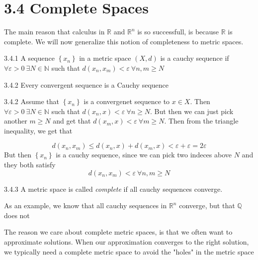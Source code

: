 \documentclass[a4paper,norsk]{article}
\renewcommand{\geq}{\geqslant}
\renewcommand{\leq}{\leqslant}
\renewcommand{\epsilon}{\varepsilon}
\begin{document}
\section*{3.4 Complete Spaces}

The main reason that calculus in $ \mathbb{R} $ and $ \mathbb{R}^n $ is so successfull, is because $ \mathbb{R} $ is complete. We will now generalize this notion of completeness to metric spaces.

\begin{definitionbox}{3.4.1}{}
A sequence $ \left\{ x_n \right\}  $ in a metric space $ \left( X, d \right)  $ is a cauchy sequence if $ \forall  \epsilon > 0 \: \exists N \in \mathbb{N} $ such that $ d(x_n, x_m) < \epsilon \: \forall n, m \geq N $ 
\end{definitionbox}

\begin{propositionbox}{3.4.2}{}
Every convergent sequence is a Cauchy sequence

\begin{proofbox}{3.4.2}{}
  Assume that $ \left\{ x_n \right\}  $ is a convergenet sequence to  $x \in  X $. Then $ \forall \epsilon > 0 \: \exists  N \in \mathbb{N} $ such that $ d(x_n, x) < \epsilon \: \forall n \geq N $. But then we can just pick another $ m \geq N $ and get that $ d(x_m, x) < \epsilon \: \forall m \geq N $. Then from the triangle inequality, we get that

  \[
      d(x_n, x_m) \leq d(x_n, x) + d(x_m, x) < \epsilon + \epsilon = 2 \epsilon 
  \]
  But then $ \left\{ x_n \right\}  $ is a cauchy sequence, since we can pick two indeces above $ N $ and they both satisfy
  \[
      d(x_n, x_m) < \epsilon \: \forall n, m \geq N
  \]
  
\end{proofbox}
\end{propositionbox}

\begin{definitionbox}{3.4.3}{}
A metric space is called \textit{complete} if all cauchy sequences converge.
\end{definitionbox}

As an example, we know that all cauchy sequences in $ \mathbb{R}^n $ converge, but that $ \mathbb{Q} $ does not


The reason we care about complete metric spaces, is that we often want to approximate solutions. When our approximation converges to the right solution, we typically need a complete metric space to avoid the "holes" in the metric space
\end{document}
